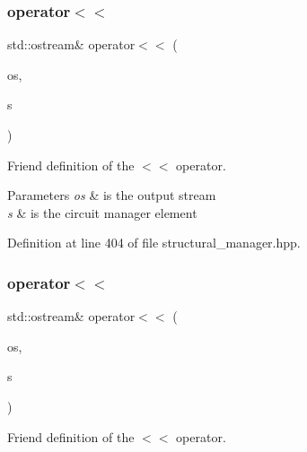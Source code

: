 \subsubsection{\texorpdfstring{operator$<$$<$}{operator<<}\hspace{0.1cm}{\footnotesize\ttfamily [1/2]}}
{\footnotesize\ttfamily std\+::ostream\& operator$<$$<$ (\begin{DoxyParamCaption}\item[{std\+::ostream \&}]{os,  }\item[{\hyperlink{classstructural__manager}{structural\+\_\+manager} \&}]{s }\end{DoxyParamCaption})\hspace{0.3cm}{\ttfamily [friend]}}



Friend definition of the $<$$<$ operator. 


\begin{DoxyParams}{Parameters}
{\em os} & is the output stream \\
\hline
{\em s} & is the circuit manager element \\
\hline
\end{DoxyParams}


Definition at line 404 of file structural\+\_\+manager.\+hpp.

\mbox{\label{classstructural__manager_acbd95dbbe26b42fd32680d2cbd994b08}} 
\subsubsection{\texorpdfstring{operator$<$$<$}{operator<<}\hspace{0.1cm}{\footnotesize\ttfamily [2/2]}}
{\footnotesize\ttfamily std\+::ostream\& operator$<$$<$ (\begin{DoxyParamCaption}\item[{std\+::ostream \&}]{os,  }\item[{const \hyperlink{structural__manager_8hpp_ab3136f0e785d8535f8d252a7b53db5b5}{structural\+\_\+manager\+Ref}}]{s }\end{DoxyParamCaption})\hspace{0.3cm}{\ttfamily [friend]}}



Friend definition of the $<$$<$ operator. 

